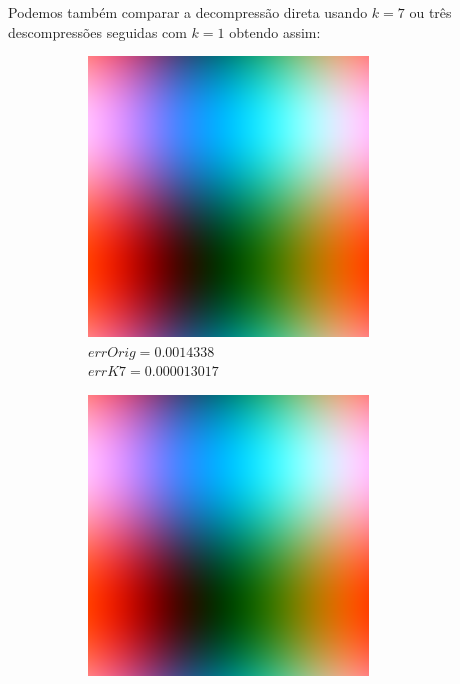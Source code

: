 \documentclass[12pt, a4paper]{article}
\begin{document}
    Podemos também comparar a decompressão direta usando $k=7$ ou três descompressões
    seguidas com $k=1$ obtendo assim:
    \begin{figure}[h!]
        \begin{center}
        \begin{subfigure}{.3\textwidth}
            \includegraphics[width=.95\textwidth]{../secFunBL111.png}
            \caption{$errOrig = 0.0014338$ \\ $errK7 = 0.000013017$}
        \end{subfigure}
        \begin{subfigure}{.3\textwidth}
            \includegraphics[width=.95\textwidth]{../secFunBC111.png}

\end{subfigure}
\end{center}
\end{figure}
\end{document}
